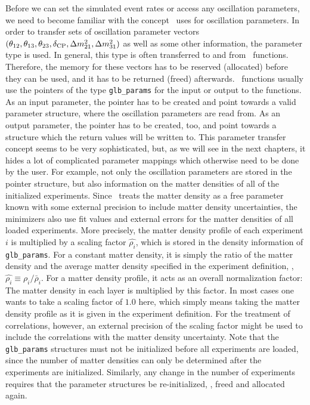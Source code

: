 Before we can set the simulated event rates or access any oscillation
parameters, we need to become familiar with the concept \GLOBES\ uses
for oscillation parameters. In order to transfer sets of oscillation
parameter vectors $(\theta_{12}, \theta_{13}, \theta_{23}, \delta_{\mathrm{CP}}, \Delta m_{21}^2, \Delta m_{31}^2)$
as well as some other information, the parameter type  is used. In general,
 this type is often
transferred to and from \GLOBES\ functions. Therefore, the memory 
for these vectors has to be reserved (allocated) before they can be used, 
and it has
to be returned (freed) afterwards. \GLOBES\ functions usually use the pointers
of the type {\tt glb\_params} for the input or output to the functions. As
an input parameter, the pointer has to be created and point towards a valid
parameter structure, where the oscillation parameters are read from. As
an output parameter, the pointer has to be created, too, and point towards
a structure which the return values will be written to.
This parameter transfer concept seems to be very sophisticated, but, as we
will see in the next chapters, it hides a lot of complicated parameter 
mappings which otherwise need to be done by the user. For example, not
only the oscillation parameters are stored in the pointer structure, but also information on the matter
densities of all of the initialized experiments. Since \GLOBES\ treats
the matter density as a free parameter known with some external precision
to include matter density uncertainties,
the minimizers also use fit values and external errors for the matter
densities of all loaded experiments. More precisely, the matter density
profile of each experiment $i$ is multiplied by a scaling factor
$\hat{\rho_i}$, 
which is stored in the density information of {\tt glb\_params}.
For a constant matter density, it is simply the ratio of the matter density and the average matter density specified in the experiment definition, \ie , $\hat{\rho_i} \equiv \rho_i/\bar{\rho}_i$. For a matter density profile, it acts as an overall normalization factor: The matter density in each layer is multiplied by this factor. In most cases one wants to take a scaling factor of $1.0$ here, which simply means taking the matter density profile as it is given in the experiment definition. For the treatment of correlations, however,
an external precision of the scaling factor might be used to include the
correlations with the matter density uncertainty.
Note that the {\tt glb\_params}
structures must not be initialized before all experiments are loaded,
since the number of matter densities can only be determined after the
experiments are initialized. 
Similarly, any change in the number of experiments requires that the
parameter structures be re-initialized, \ie, freed and allocated again.



